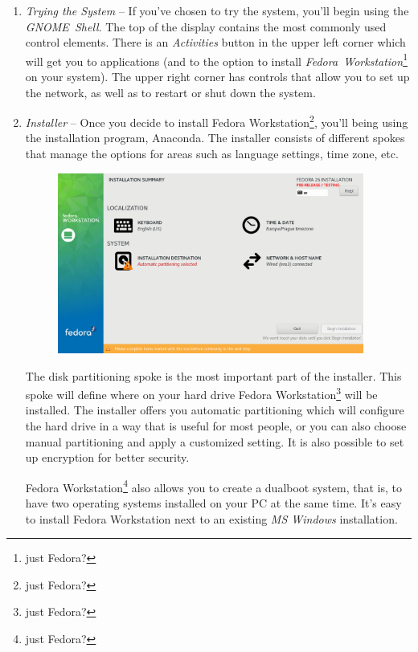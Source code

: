 \begin{enumerate}
\item\emph{Trying the System} -- If you've chosen to try the system, you'll begin using the \emph{GNOME~Shell}. The top of the display contains the most commonly used control elements. There is an \emph{Activities} button in the upper left corner which will get you to applications (and to the option to install \emph{Fedora~Workstation}\footnote{just Fedora?} on your system). The upper right corner has controls that allow you to set up the network, as well as to restart or shut down the system.

\item\emph{Installer} -- Once you decide to install Fedora Workstation\footnote{just Fedora?}, you'll being using the installation program, Anaconda. The installer consists of different spokes that manage the options for areas such as language settings, time zone, etc.

\begin{figure}[ht]
\begin{center}
\includegraphics[width=0.95\textwidth]{img/installer-b}
 \label{fig:installer-b}
\end{center}
\end{figure}

The disk partitioning spoke is the most important part of the installer. This spoke will define where on your hard drive Fedora Workstation\footnote{just Fedora?} will be installed. The installer offers you automatic partitioning which will configure the hard drive in a way that is useful for most people, or you can also choose manual partitioning and apply a customized setting. It is also possible to set up encryption for better security.

Fedora Workstation\footnote{just Fedora?} also allows you to create a dualboot system, that is, to have two operating systems installed on your PC at the same time. It's easy to install Fedora Workstation next to an existing \emph{MS Windows} installation.


\end{enumerate}

